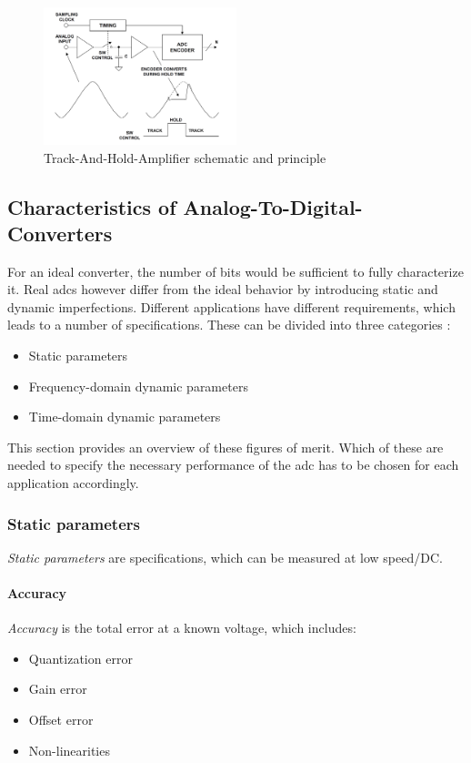 \begin{figure}[tbh]
	\centering
	\includegraphics[width = 0.5\textwidth]{chap/02-theory/img/tha}
	\caption{Track-And-Hold-Amplifier schematic and principle \cite{walt}}
	\label{fig:tha}
\end{figure}

\subsection{Characteristics of Analog-To-Digital-Converters}



For an ideal converter, the number of bits would be sufficient to fully characterize it.
Real \glspl{adc} however differ from the ideal behavior by introducing static and dynamic imperfections.
Different applications have different requirements, which leads to a number of specifications. These can be divided into three categories \cite{Lundberg}:
\begin{itemize}[noitemsep]
	\item Static parameters
	\item Frequency-domain dynamic parameters
	\item Time-domain dynamic parameters
\end{itemize}
This section provides an overview of these figures of merit. Which of these are needed to specify the necessary performance of the \gls{adc} has to be chosen for each application accordingly.


\subsubsection{Static parameters}
\textit{Static parameters} are specifications, which can be measured at low speed/DC. 
\paragraph{Accuracy}
\textit{Accuracy} is the total error at a known voltage, which includes:
\begin{itemize}[noitemsep]
	\item Quantization error
	\item Gain error
	\item Offset error
	\item Non-linearities
\end{itemize}

